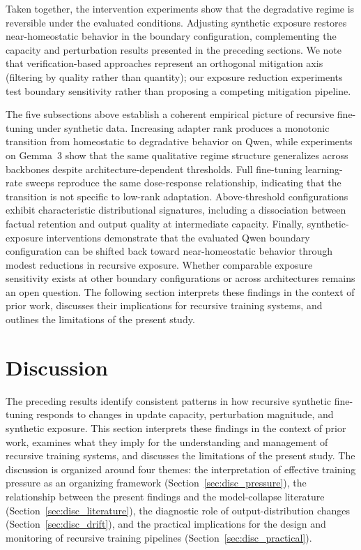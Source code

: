 \documentclass[a4paper,fleqn]{cas-dc}
\begin{document}
Taken together, the intervention experiments show that the degradative regime is
reversible under the evaluated conditions. Adjusting synthetic exposure restores
near-homeostatic behavior in the boundary configuration, complementing the
capacity and perturbation results presented in the preceding sections. We note
that verification-based approaches \citep{yi2025} represent an orthogonal
mitigation axis (filtering by quality rather than quantity); our exposure
reduction experiments test boundary sensitivity rather than proposing a
competing mitigation pipeline.

The five subsections above establish a coherent empirical picture of recursive
fine-tuning under synthetic data. Increasing adapter rank produces a monotonic
transition from homeostatic to degradative behavior on Qwen, while experiments
on Gemma~3 show that the same qualitative regime structure generalizes across
backbones despite architecture-dependent thresholds. Full fine-tuning
learning-rate sweeps reproduce the same dose-response relationship, indicating
that the transition is not specific to low-rank adaptation. Above-threshold
configurations exhibit characteristic distributional signatures, including a
dissociation between factual retention and output quality at intermediate
capacity. Finally, synthetic-exposure interventions demonstrate that the
evaluated Qwen boundary configuration can be shifted back toward
near-homeostatic behavior through modest reductions in recursive exposure.
Whether comparable exposure sensitivity exists at other boundary configurations
or across architectures remains an open question. The following section
interprets these findings in the context of prior work, discusses their
implications for recursive training systems, and outlines the limitations of
the present study.

\section{Discussion}\label{sec:discussion}

The preceding results identify consistent patterns in how recursive synthetic
fine-tuning responds to changes in update capacity, perturbation magnitude, and
synthetic exposure. This section interprets these findings in the context of
prior work, examines what they imply for the understanding and management of
recursive training systems, and discusses the limitations of the present study.
The discussion is organized around four themes: the interpretation of effective
training pressure as an organizing framework
(Section~\ref{sec:disc_pressure}), the relationship between the present findings
and the model-collapse literature (Section~\ref{sec:disc_literature}), the
diagnostic role of output-distribution changes (Section~\ref{sec:disc_drift}),
and the practical implications for the design and monitoring of recursive
training pipelines (Section~\ref{sec:disc_practical}).
\end{document}
